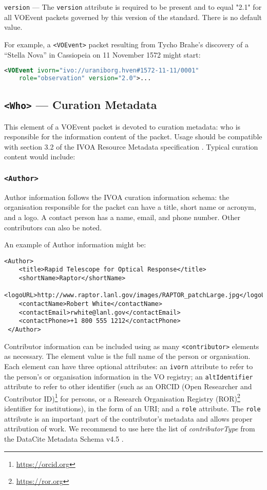 \documentclass[11pt,a4paper]{ivoa}
\begin{document}
 \texttt{version} \label{sec:3.1.3} --- 
The \texttt{version} attribute is required to be present and to equal "2.1" for 
all VOEvent packets governed by this version of the standard. There is no 
default value. 

For example, a \texttt{<VOEvent>} packet resulting from Tycho Brahe's discovery of 
a ``Stella Nova'' in Cassiopeia on 11 November 1572 might start: 
\begin{lstlisting}[language=XML]
<VOEvent ivorn="ivo://uraniborg.hven#1572-11-11/0001" 
    role="observation" version="2.0">...
\end{lstlisting}

\subsection{\texttt{<Who>} --- Curation Metadata}
\label{sec:3.2}
This element of a VOEvent packet is devoted to curation metadata: who is
responsible for the information content of the packet. Usage should be
compatible with section 3.2 of the IVOA Resource Metadata specification
\citep{2007ivoa.spec.0302H}. Typical curation content would include:

\subsubsection{\texttt{<Author>}}
Author information follows the IVOA curation information schema: the 
organisation responsible for the packet can have a title, short name or acronym,
and a logo. A contact person has a name, email, and phone number. Other
contributors can also be noted.

An example of Author information might be:
\begin{lstlisting}
<Author>
    <title>Rapid Telescope for Optical Response</title>
    <shortName>Raptor</shortName>
    <logoURL>http://www.raptor.lanl.gov/images/RAPTOR_patchLarge.jpg</logoURL>
    <contactName>Robert White</contactName>
    <contactEmail>rwhite@lanl.gov</contactEmail>
    <contactPhone>+1 800 555 1212</contactPhone>
 </Author>
\end{lstlisting}

Contributor information can be included using as many \texttt{<contributor>} 
elements as necessary. The element value is the full name of the person or 
organisation. Each element can have three optional attributes: an \texttt{ivorn} 
attribute to refer to the person's or organisation information in the VO 
registry; an \texttt{altIdentifier} attribute to refer to other identifier (such 
as an ORCID (Open Researcher and Contributor ID)\footnote{
\url{https://orcid.org}} for persons, or a Research Organisation Registry 
(ROR)\footnote{\url{https://ror.org}} identifier for institutions), in the form 
of an URI; and a \texttt{role} attribute. The \texttt{role} attribute is an important 
part of the contributor's metadata and allows proper attribution of work. We 
recommend to use here the list of \emph{contributorType} from the DataCite 
Metadata Schema v4.5 \citep{https://doi.org/10.14454/g8e5-6293}.
\end{document}
